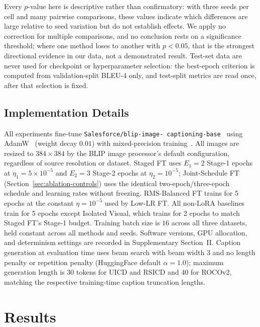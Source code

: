 \documentclass[journal]{IEEEtran}
\begin{document}
Every $p$-value here is descriptive rather than confirmatory: with
three seeds per cell and many pairwise comparisons, these values
indicate which differences are large relative to seed variation but do
not establish effects. We apply no correction for multiple
comparisons, and no conclusion rests on a significance threshold;
where one method loses to another with $p < 0.05$, that is the
strongest directional evidence in our data, not a demonstrated result.
Test-set data are never used for checkpoint or hyperparameter
selection: the best-epoch criterion is computed from validation-split
BLEU-4 only, and test-split metrics are read once, after that
selection is fixed.

\subsection{Implementation Details}
\label{sec:impl-details}
All experiments fine-tune \texttt{Salesforce/blip-image-\allowbreak
captioning-base}~\cite{li2022blip} using AdamW~\cite{loshchilov2019adamw} (weight decay $0.01$) with mixed-precision training~\cite{micikevicius2018mixed}. All images are resized to $384\times384$ by the BLIP image processor's default configuration, regardless of source resolution or dataset. Staged FT uses $E_1{=}2$ Stage-1 epochs at $\eta_1 = 5\times10^{-5}$ and $E_2{=}3$ Stage-2 epochs at $\eta_2 = 10^{-5}$; Joint-Schedule FT
(Section~\ref{sec:ablation-controls}) uses the identical
two-epoch/three-epoch schedule and learning rates without freezing. RMS-Balanced FT trains for 5 epochs at the constant $\eta = 10^{-5}$ used by Low-LR FT. All non-LoRA baselines train for 5 epochs except Isolated Visual, which trains for 2 epochs to match Staged FT's Stage-1 budget. Training batch size is $16$ across all three datasets, held constant across all methods and seeds. Software versions, GPU allocation, and determinism settings are
recorded in Supplementary Section~II. Caption generation at evaluation time uses beam search with beam width $3$ and no length penalty or repetition penalty (HuggingFace default $\alpha=1.0$); maximum generation length is $30$ tokens for UICD and RSICD and $40$ for
ROCOv2, matching the respective training-time caption truncation
lengths.

\section{Results}
\label{sec:results}
\end{document}
